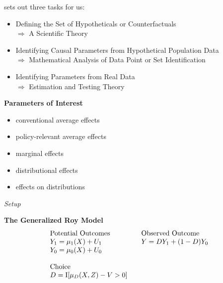 \begin{frame}
	 sets out three tasks for us:
	\begin{itemize}\setlength\itemsep{1em}
		\item Defining the Set of Hypotheticals or Counterfactuals \\\hspace{0.3cm}
		$\Rightarrow$ A Scientific Theory
		\item Identifying Causal Parameters from Hypothetical Population Data \\\hspace{0.3cm}
		$\Rightarrow$ Mathematical Analysis of  Data Point or Set Identification
		\item Identifying Parameters from Real Data\\\hspace{0.3cm}
		$\Rightarrow$ Estimation and Testing Theory
	\end{itemize}
\end{frame}
\begin{frame}
\textbf{Parameters of Interest}\\\vspace{0.3cm}
	\begin{itemize}\setlength\itemsep{1em}
		\item conventional average effects
		\item policy-relevant average effects
		\item marginal effects
		\item distributional effects
		\item effects on distributions
	\end{itemize}
\end{frame}
\begin{frame}\begin{center}
		\LARGE\textit{Setup}
\end{center}\end{frame}
\begin{frame}
	\textbf{The Generalized Roy Model}
	\begin{align*}\begin{array}{l@{\qquad}l}
			\text{Potential Outcomes} &\text{Observed Outcome}\\
			Y_1 = \mu_1(X) + U_1      &  Y = D Y_1 + (1 - D)Y_0 \\
			Y_0 = \mu_0(X) + U_0      &\\
			& \\
			\text{Choice} & \\
			D = \mathrm{I}[\mu_D(X, Z) - V > 0] & \\
		\end{array}
	\end{align*}
\end{frame}
